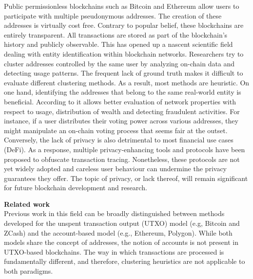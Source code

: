 \documentclass[12pt,a4paper,titlepage,oneside,english]{article}
\begin{document}
Public permissionless blockchains such as Bitcoin \citep{nakamotoBitcoin2008} and Ethereum \citep{buterin2014ethereum} allow users %
 to participate with multiple pseudonymous addresses. The creation of these addresses is virtually cost free. Contrary to popular belief, these blockchains are entirely transparent. All transactions are stored as part of the blockchain's history and publicly observable.
This has opened up a nascent scientific field dealing with entity identification within blockchain networks. Researchers try to cluster addresses controlled by the same user by analyzing on-chain data and detecting usage patterns. The frequent lack of ground truth makes it difficult to evaluate different clustering methods. As a result, most methods are heuristic. %
\newline On one hand, identifying the addresses that belong to the same real-world entity is beneficial. According to \cite{FV:17} it allows better evaluation of network properties with respect to usage, distribution of wealth and detecting fraudulent activities. For instance, if a user distributes their voting power across various addresses, they might manipulate an on-chain voting process that seems fair at the outset. \newline
Conversely, the lack of privacy is also detrimental to most financial use cases (DeFi). As a response, multiple privacy-enhancing tools and protocols have been proposed to obfuscate transaction tracing. 
Nonetheless, these protocols are not yet widely adopted and careless user behaviour can undermine the privacy guarantees they offer. \newline
The topic of privacy, or lack thereof, will remain significant for future blockchain development and research.


\textbf{Related work}\\
Previous work in this field can be broadly distinguished between methods %
 developed for the unspent transaction output (UTXO) model (e.g, Bitcoin and ZCash) and the account-based model (e.g., Ethereum, Polygon). While both models share the concept of addresses, the notion of accounts is not present in UTXO-based blockchains. The way in which transactions are processed is fundamentally different, and therefore, clustering heuristics are not applicable to both paradigms.
\end{document}
